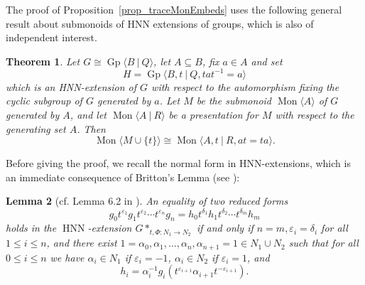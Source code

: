 \documentclass{amsart}
\newcommand{\Mpres}[2]{\operatorname{Mon}\bigl\langle #1\:|\:#2 \bigr\rangle}
\newcommand{\Mgen}[1]{\operatorname{Mon}\bigl\langle #1 \bigr\rangle}
\newcommand{\Gpres}[2]{\operatorname{Gp}\bigl\langle #1\:|\:#2 \bigr\rangle}
\theoremstyle{plain}
\newtheorem{theorem}{Theorem}[section]
\newtheorem{lemma}[theorem]{Lemma}
\theoremstyle{definition}
\begin{document}
The proof of Proposition~\ref{prop_traceMonEmbeds} uses the following general result about submonoids of HNN extensions of groups, which is also of independent interest.   

\begin{theorem}\label{SubmonoidsOfHNNExtensions}
Let $G \cong \Gpres{B}{Q}$, let $A \subseteq B$, fix $a \in A$ and set 
\[
H = \Gpres{B,t}{Q, tat^{-1}=a}
\]  
which is an HNN-extension of $G$ with respect to the automorphism fixing the cyclic subgroup of $G$ generated by $a$. 
Let $M$ be the submonoid $\Mgen{A}$ of $G$ generated by $A$, and let $\Mpres{A}{R}$ be a presentation for $M$ with respect to the generating set $A$. 
Then 
\[
\Mgen{M \cup \{ t \}} \cong \Mpres{A,t}{R, at=ta}. 
\]   
\end{theorem}
  
  
Before giving the proof, we recall the normal form in HNN-extensions, which is an immediate consequence of Britton's Lemma (see \cite[Ch. IV]{lyndon1977combinatorial}): 

\begin{lemma}[cf. Lemma 6.2 in \cite{dolinka2021new}]\label{lem: HNN normal form}
An equality of two reduced forms
\[
g_0 t^{\varepsilon_1} g_1 t^{\varepsilon_2} \cdots t^{\varepsilon_n} g_n = h_0 t^{\delta_1} h_1 t^{\delta_2} \cdots t^{\delta_m} h_m
\]
holds in the $\operatorname{HNN}$-extension
$G*_{t, \Phi: N_1 \rightarrow N_2}$ if and only if $n = m, \varepsilon_i = \delta_i$ for all $1 \leq i \leq n$, and there exist $1 = \alpha_0, \alpha_1, \ldots, \alpha_n, \alpha_{n+1} = 1 \in N_1 \cup N_2$ such that for all
$0 \leq i \leq n$ we have $\alpha_i \in N_1$ if $\varepsilon_i = -1$, $\alpha_i \in N_2$  if $\varepsilon_i = 1$, and
\[
h_i = \alpha_i^{-1} g_i (t^{\varepsilon_{i+1}} \alpha_{i+1}t^{-\varepsilon_{i+1}}).
\]
\end{lemma}
\end{document}
